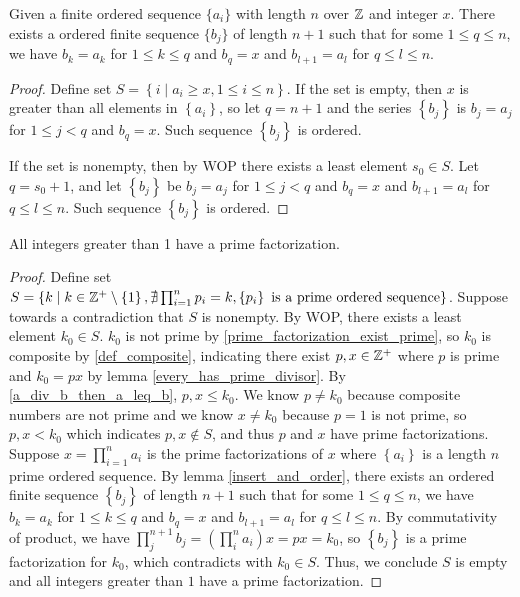 \begin{lemma}\label{insert_and_order}
    Given a finite ordered sequence $\{a_i\}$ with length $n$ over $\mathbb{Z}$ and integer $x$. There exists a ordered finite sequence $\{b_j\}$ of length $n+1$ such that for some $1\leq q\leq n$, we have $b_k=a_k$ for $1\leq k\leq q$ and $b_q=x$ and $b_{l+1}=a_l$ for $q\leq l\leq n$.
\end{lemma}
\begin{proof}
    Define set $S=\left\{ i \mid a_i\geq x, 1\leq i\leq n\right\}$. If the set is empty, then $x$ is greater than all elements in $\left\{a_i\right\}$, so let $q=n+1$ and the series $\left\{b_j\right\}$ is $b_j=a_j$ for $1\leq j< q$ and $b_{q}=x$. Such sequence $\left\{b_j\right\}$ is ordered. 
    
    If the set is nonempty, then by WOP there exists a least element $s_0\in S$. Let $q=s_0+1$, and let $\left\{b_j\right\}$ be $b_j=a_j$ for $1\leq j<q$ and $b_q=x$ and $b_{l+1}=a_l$ for $q\leq l\leq n$. Such sequence $\left\{b_j\right\}$ is ordered.
\end{proof}

\begin{theorem}\label{prime_factorization_exist_all}
    All integers greater than 1 have a prime factorization.
\end{theorem}
\begin{proof}
    Define set $S=\left\{ k\mid k\in\mathbb{Z}^+\setminus\left\{1\right\}, \nexists\prod_{i=1}^n p_i=k, \left\{p_i\right\} \text{ is a prime ordered sequence}  \right\}$. Suppose towards a contradiction that $S$ is nonempty. By WOP, there exists a least element $k_0\in S$. $k_0$ is not prime by \ref{prime_factorization_exist_prime}, so $k_0$ is composite by \ref{def_composite}, indicating there exist $p,x\in\mathbb{Z}^+$ where $p$ is prime and $k_0=px$ by lemma \ref{every_has_prime_divisor}. By \ref{a_div_b_then_a_leq_b}, $p,x\leq k_0$. We know $p\neq k_0$ because composite numbers are not prime and we know $x\neq k_0$ because $p=1$ is not prime, so $p,x<k_0$ which indicates $p,x\notin S$, and thus $p$ and $x$ have prime factorizations. Suppose $x=\prod_{i=1}^n a_i$ is the prime factorizations of $x$ where $\left\{a_i\right\}$ is a length $n$ prime ordered sequence. By lemma \ref{insert_and_order}, there exists an ordered finite sequence $\left\{b_j\right\}$ of length $n+1$ such that for some $1\leq q\leq n$, we have $b_k=a_k$ for $1\leq k\leq q$ and $b_q=x$ and $b_{l+1}=a_l$ for $q\leq l\leq n$. By commutativity of product, we have $\prod_j^{n+1} b_j=(\prod_i^n a_i)x=px=k_0$, so $\left\{b_j\right\}$ is a prime factorization for $k_0$, which contradicts with $k_0\in S$. Thus, we conclude $S$ is empty and all integers greater than $1$ have a prime factorization.
\end{proof}

